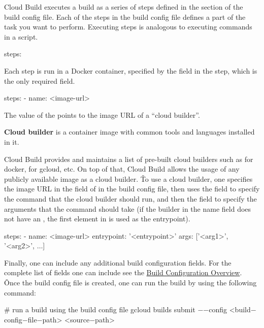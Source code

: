 Cloud Build executes a build as a series of steps defined in the  section of the build config file. Each
of the steps in the build config file defines a part of the task you want to perform. Executing steps is analogous
to executing commands in a script.
\begin{block}
steps:
\end{block}

Each step is run in a Docker container, specified by the  field in the step, which is the only required
field.
\begin{block}
steps:
    - name: <image-url>
\end{block}

The value of the  points to the image URL of a ``cloud builder''.

\textbf{Cloud builder} is a container image with common tools and languages installed in it.
\ed

Cloud Build provides and maintains a list of pre-built cloud builders such as  for
docker,  for gcloud, etc. On top of that, Cloud Build allows the usage of any
publicly available image as a cloud builder. \v

To use a cloud builder, one specifies the image URL in the  field of  in the build config file,
then uses the  field to specify the command that the cloud builder should run, and then the 
field to specify the arguments that the command should take (if the builder in the name field does not have an
, the first element in  is used as the entrypoint).
\begin{block}
steps:
    - name: <image-url>
      entrypoint: '<entrypoint>'
      args: ['<arg1>', '<arg2>', $\dots$]
\end{block}

Finally, one can include any additional build configuration fields. For the complete list of fields one can include
see the \href{https://cloud.google.com/build/docs/build-config-file-schema}{Build Configuration Overview}. \v

Once the build config file is created, one can run the build by using the following command:
\begin{bash}
# run a build using the build config file
gcloud builds submit $-$$-$config <build$-$config$-$file$-$path> <source$-$path>
\end{bash}

